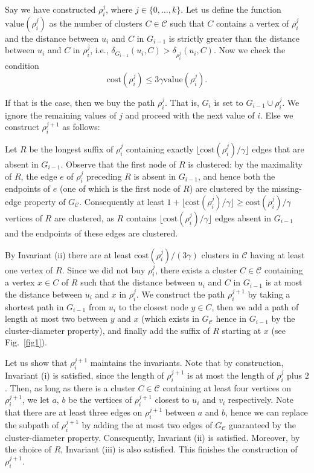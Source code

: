 \documentclass[a4paper,11pt]{article}
\theoremstyle{definition}
\newcommand{\dist}{\delta}
\newcommand{\cost}{\mathrm{cost}}
\newcommand{\val}{\mathrm{value}}
\newcommand{\cC}{\mathcal{C}}
\begin{document}
Say we have constructed $\rho_i^j$, where $j \in \{0,\ldots,k\}$.
Let us define the function $\val(\rho_i^j)$ as the number of clusters $C \in \cC$ 
such that $C$ contains a vertex of $\rho_i^j$ and the distance
between $u_i$ and $C$ in $G_{i-1}$ is strictly greater than
the distance between $u_i$ and $C$ in $\rho_i^j$, i.e., $\dist_{G_{i-1}} (u_i,C) > \dist_{\rho_i^j}(u_i,C)$.
Now we check the condition 
$$\cost(\rho_i^j) \le 3\gamma\val(\rho_i^j).$$ 

If that is the case, then we buy the path $\rho_i^j$. That is, $G_i$ is set to $G_{i-1} \cup \rho_i^j$.
We ignore the remaining values of $j$ and proceed with the next value of $i$.
Else we construct $\rho_i^{j+1}$ as follows:


Let $R$ be the longest suffix of $\rho_i^j$ containing exactly $\lfloor \cost(\rho_i^j)/\gamma \rfloor$ edges that are absent in $G_{i-1}$.
Observe that the first node of $R$ is clustered:
by the maximality of $R$, the edge $e$ of $\rho_i^j$ preceding $R$
is absent in $G_{i-1}$, and hence both the endpoints of $e$ (one of which is the first node of $R$) are clustered by the missing-edge property of $G_\cC$. 
Consequently at least $1+\lfloor \cost(\rho_i^j)/\gamma \rfloor \ge \cost(\rho_i^j)/\gamma$ 
vertices of $R$ are clustered, as $R$ contains $\lfloor \cost(\rho_i^j)/\gamma \rfloor$ edges
absent in $G_{i-1}$ and the endpoints of these edges are clustered. 

By Invariant (ii) there are at least $\cost(\rho_i^j)/(3\gamma)$ clusters in $\cC$
having at least one vertex of $R$. Since we did not buy $\rho_i^j$, there
exists a cluster $C \in \cC$ containing a vertex $x \in C$ of $R$ such that the distance between $u_i$ 
and $C$ in $G_{i-1}$ is at most the distance between $u_i$ and $x$ in $\rho_i^j$. We construct the path $\rho_i^{j+1}$ by taking
a shortest path in $G_{i-1}$ from $u_i$ to the closest node $y\in C$, then we add a path of length at most two between $y$ and $x$ (which exists in $G_\cC$ hence in $G_{i-1}$ by the cluster-diameter property), and finally add the suffix of $R$ starting at $x$ (see Fig.~\ref{fig1}).




Let us show that $\rho^{j+1}_i$ maintains the invariants. Note that by construction, Invariant (i) is satisfied, since the length of $\rho_i^{j+1}$ is at most the length of $\rho_i^j$ plus $2$.
Then, as long as there is a cluster $C \in \cC$ containing at least four vertices on $\rho_i^{j+1}$,
we let $a$, $b$ be the vertices of $\rho_i^{j+1}$ closest to $u_i$ and $v_i$ respectively.
Note that there are at least three edges on $\rho_i^{j+1}$ between $a$ and $b$, hence we
can replace the subpath of $\rho_i^{j+1}$ by adding the at most two edges of $G_\cC$
guaranteed by the cluster-diameter property.
Consequently, Invariant (ii) is satisfied. Moreover, by the choice of $R$, Invariant (iii) is also satisfied.
This finishes the construction of $\rho_i^{j+1}$. 
\end{document}
